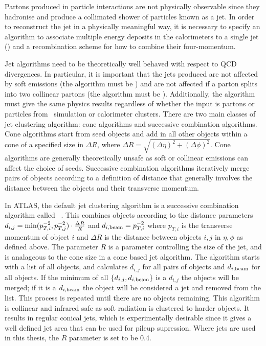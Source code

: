 Partons produced in particle interactions are not physically observable since
they hadronise and produce a collimated shower of particles known as a jet. In
order to reconstruct the jet in a physically meaningful way, it is necessary to
specify an algorithm to associate multiple energy deposits in the calorimeters
to a single jet () and a recombination scheme for how to combine their
four-momentum. 

Jet algorithms need to be theoretically well behaved with respect to QCD
divergences. In particular, it is important that the jets produced are not
affected by soft emissions (the algorithm must be ) and
are not affected if a parton splits into two collinear partons (the algorithm
must be ). Additionally, the algorithm must give the same
physics results regardless of whether the input is partons or particles from
\mc\ simulation or calorimeter clusters. There are two main classes of
jet clustering algorithm: cone algorithms and successive combination algorithms.
Cone algorithms start from seed objects and add in all other objects within a
cone of a specified size in $\Delta R$, where $\Delta R = \sqrt{(\Delta \eta)^{2} + (\Delta
\phi)^{2}} $. Cone algorithms are generally theoretically unsafe as soft or
collinear emissions can affect the choice of seeds. Successive combination
algorithms iteratively merge pairs of objects according to a definition of distance that
generally involves the distance between the objects and their transverse
momentum.

In ATLAS, the default jet clustering algorithm is a successive combination
algorithm called \antikt~\cite{1126-6708-2008-04-063}. This combines objects
according to the distance parameters $d_{i,j} =
{\rm min}(p_{T,i}^{-2},p_{T,j}^{-2}) \cdot \frac{ \Delta R }{R}$ and $d_{i,\rm{beam}} =
p_{T,i}^{-2}$ where $p_{T,i}$ is the transverse momentum of object $i$ and
$\Delta R$ is the distance between objects $i,j$ in $\eta, \phi$ as defined above.
The parameter $R$ is a parameter controlling the size of the jet, and is
analageous to the cone size in a cone based jet algorithm. The algorithm starts
with a list of all objects, and calculates $d_{i,j}$ for all pairs of objects and
$d_{i,{\rm beam}}$ for all objects. If the minimum of all $\{ d_{i,j}, d_{i,{\rm
beam}} \}$ is a  $d_{i,j}$ the objects will be merged; if it is a $ d_{i,{\rm
beam}}$ the object will be considered a jet and removed from the list. This
process is repeated until there are no objects remaining. This algorithm is
collinear and infrared safe as soft radiation is clustered to harder objects. 
It results in regular conical jets, which is experimentally desirable
since it gives a well defined jet area that can be used for pileup supression.
Where jets are used in this thesis, the $R$ parameter is set to be 0.4.

